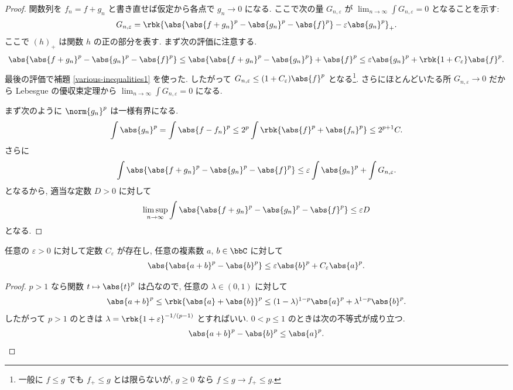 \documentclass[openany, a4paper, oneside]{jsbook}
\begin{document}
\begin{proof}
関数列を $f_n = f + g_n$ と書き直せば仮定から各点で $g_n \to 0$ になる.
ここで次の量 $G_{n, \varepsilon}$ が $\lim_{n \to \infty} \int G_{n, \varepsilon} = 0$ となることを示す:
\begin{align}
 G_{n, \varepsilon}
 =
 \rbk{\abs{\abs{f + g_n}^p - \abs{g_n}^p - \abs{f}^p} - \varepsilon \abs{g_n}^p}_{+}.
\end{align}
ここで $(h)_{+}$ は関数 $h$ の正の部分を表す.
まず次の評価に注意する.
\begin{align}
 \abs{\abs{f + g_n}^p - \abs{g_n}^p - \abs{f}^p}
 \leq
 \abs{\abs{f + g_n}^p - \abs{g_n}^p} + \abs{f}^p
 \leq
 \varepsilon \abs{g_n}^p + \rbk{1 + C_{\varepsilon}} \abs{f}^p.
\end{align}
最後の評価で補題 \ref{various-inequalities1} を使った.
したがって $G_{n, \varepsilon} \leq (1 + C_{\varepsilon}) \abs{f}^p$ となる\footnote{一般に $f \leq g$ でも $f_+ \leq g$ とは限らないが,
$g \geq 0$ なら $f \leq g \rightarrow f_{+} \leq g$.}.
さらにほとんどいたる所 $G_{n, \varepsilon} \to 0$ だから Lebesgue の優収束定理から
$\lim_{n \to \infty} \int G_{n, \varepsilon} = 0$ になる.

まず次のように $\norm{g_n}^p$ は一様有界になる.
\begin{align}
 \int \abs{g_n}^p
 =
 \int \abs{f - f_n}^p
 \leq
 2^p \int \rbk{\abs{f}^p + \abs{f_n}^p}
 \leq
 2^{p+1} C.
\end{align}
さらに
\begin{align}
 \int \abs{\abs{f + g_n}^p - \abs{g_n}^p - \abs{f}^p}
 \leq
 \varepsilon \int \abs{g_n}^p + \int G_{n, \varepsilon}.
\end{align}
となるから, 適当な定数 $D > 0$ に対して
\begin{align}
 \limsup_{n \to \infty} \int \abs{\abs{f + g_n}^p - \abs{g_n}^p - \abs{f}^p}
 \leq
 \varepsilon D
\end{align}
となる.
\end{proof}

\begin{lem}\label{various-inequalities1}
任意の $\varepsilon > 0$ に対して定数 $C_{\varepsilon}$ が存在し, 任意の複素数 $a$, $b \in \bbC$ に対して
\begin{align}
 \abs{\abs{a + b}^p - \abs{b}^p}
 \leq
 \varepsilon \abs{b}^p + C_{\varepsilon} \abs{a}^p.
\end{align}
\end{lem}
\begin{proof}
$p > 1$ なら関数 $t \mapsto \abs{t}^p$ は凸なので, 任意の $\lambda \in (0, 1)$ に対して
\begin{align}
 \abs{a + b}^p
 \leq
 \rbk{\abs{a} + \abs{b}}^p
 \leq
 (1 - \lambda)^{1 - p} \abs{a}^p + \lambda^{1 - p} \abs{b}^p.
\end{align}
したがって $p > 1$ のときは $\lambda = \rbk{1 + \varepsilon}^{- 1 / (p - 1)}$ とすればいい.
$0 < p \leq 1$ のときは次の不等式が成り立つ.
\begin{align}
 \abs{a + b}^p - \abs{b}^p
 \leq
 \abs{a}^p.
\end{align}
\end{proof}
\end{document}
